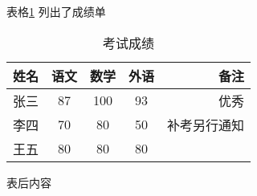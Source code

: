 \documentclass{article} %
\begin{document}
	
	表格\ref{table1} 列出了成绩单
	\begin{table}[htbp]	%
		\centering
		\caption{考试成绩}
		\label{table1}
			\begin{tabular}{l|c|c|c|r}	%
			\hline	%
			姓名 & 语文 & 数学 & 外语 & 备注 \\	%
			\hline
			张三 & 87 & 100 & 93 & 优秀 \\
			\hline
			李四 & 70 & 80 & 50 & 补考另行通知 \\
			\hline
			王五 & 80 & 80 & 80 \\
			\hline
		\end{tabular}
	\end{table}

	表后内容
\end{document}
